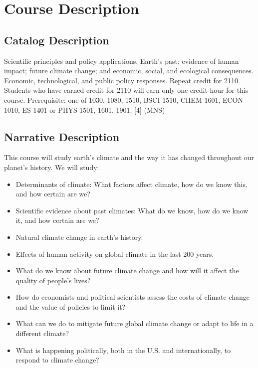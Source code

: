 \documentclass[11pt,twoside]{jgsyllabus}\usepackage[]{graphicx}\usepackage[]{color}
\begin{document}
\medskip
\clearpage
\section[Description]{Course Description}
\subsection{Catalog Description}
Scientific principles and policy applications. Earth's past; evidence of human impact; future climate change; and economic, social, and ecological consequences. Economic, technological, and public policy responses. Repeat credit for 2110. Students who have earned credit for 2110 will earn only one credit hour for this course. Prerequisite: one of 1030, 1080, 1510, BSCI 1510, CHEM 1601, ECON 1010, ES 1401 or PHYS 1501, 1601, 1901. [4] (MNS)
\subsection{Narrative Description}
This course will study earth's climate and the way it has changed throughout our planet's
history. We will study:
\begin{itemize}
	\item Determinants of climate: What factors affect climate, how do we know this, and
    how certain are we?
    \item Scientific evidence about past climates: What do we know, how do we know it,
    and how certain are we?
	\item Natural climate change in earth's history.
	\item Effects of human activity on global climate in the last 200 years.
	\item What do we know about future climate change and how will it affect the quality
	of people's lives?
	\item How do economists and political scientists assess the costs of climate change
	and the value of policies to limit it?
	\item What can we do to mitigate future global climate change or adapt to life in a
	different climate?
	\item What is happening politically, both in the U.S. and internationally, to respond
	to climate change?
\end{itemize}
\end{document}
